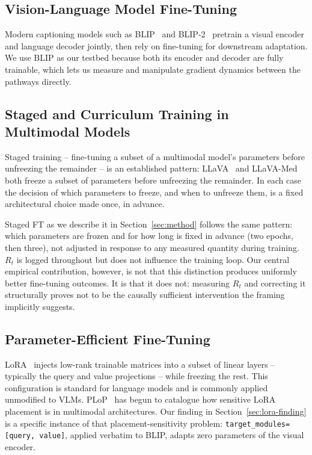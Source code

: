 \documentclass[journal]{IEEEtran}
\begin{document}
\subsection{Vision-Language Model Fine-Tuning}
Modern captioning models such as BLIP~\cite{li2022blip} and
BLIP-2~\cite{li2023blip2} pretrain a visual encoder and language
decoder jointly, then rely on fine-tuning for downstream adaptation. We use BLIP as our testbed because both its encoder and decoder are fully trainable, which lets us measure and manipulate gradient dynamics between the pathways directly.

\subsection{Staged and Curriculum Training in Multimodal Models}
Staged training -- fine-tuning a subset of a multimodal model's
parameters before unfreezing the remainder -- is an established
pattern: LLaVA~\cite{liu2023llava} and
LLaVA-Med~\cite{li2023llavamed} both freeze a subset of parameters
before unfreezing the remainder. In each case the decision of which parameters to freeze, and when to unfreeze them, is a fixed
architectural choice made once, in advance.

Staged FT as we describe it in Section~\ref{sec:method} follows
the same pattern: which parameters are frozen and for how long is
fixed in advance (two epochs, then three), not adjusted in
response to any measured quantity during training. $R_t$ is
logged throughout but does not influence the training loop. Our
central empirical contribution, however, is not that this distinction produces uniformly better fine-tuning outcomes. It is that it does not: measuring $R_t$ and correcting it structurally proves not to be the causally sufficient intervention the framing implicitly suggests.

\subsection{Parameter-Efficient Fine-Tuning}
LoRA~\cite{hu2022lora} injects low-rank trainable matrices into a
subset of linear layers -- typically the query and value projections -- while freezing the rest. This configuration is standard for language models and is commonly applied unmodified to VLMs. PLoP~\cite{hayou2025plop} has begun to catalogue how sensitive LoRA placement is in multimodal architectures. Our finding in Section~\ref{sec:lora-finding} is a specific instance of that placement-sensitivity problem:
\texttt{target\_modules=[query, value]}, applied verbatim to BLIP,
adapts zero parameters of the visual encoder.
\end{document}
